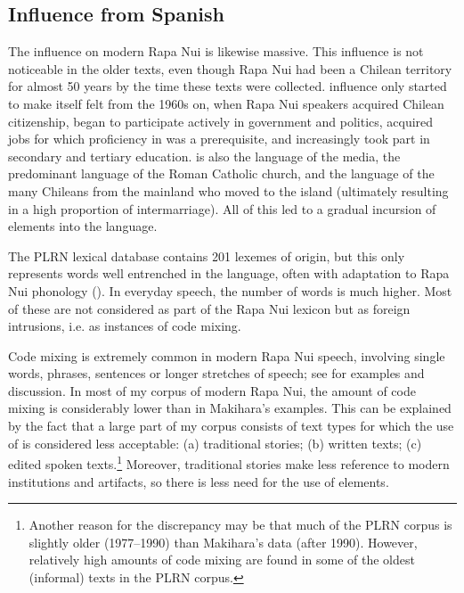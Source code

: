 \subsection{Influence from Spanish}\label{sec:1.4.2}

The  influence on modern Rapa Nui is likewise massive. This influence is not noticeable in the older texts, even though Rapa Nui had been a Chilean territory for almost 50 years by the time these texts were collected.  influence only started to make itself felt from the 1960s on, when Rapa Nui speakers acquired Chilean citizenship, began to participate actively in government and politics, acquired jobs for which proficiency in  was a prerequisite, and increasingly took part in secondary and tertiary education.  is also the language of the media, the predominant language of the Roman Catholic church, and the language of the many Chileans from the mainland who moved to the island (ultimately resulting in a high proportion of intermarriage). All of this led to a gradual incursion of  elements into the language. 

The PLRN lexical database contains 201 lexemes of  origin, but this only represents words well entrenched in the language, often with adaptation to Rapa Nui phonology (). In everyday speech, the number of  words is much higher. Most of these are not considered as part of the Rapa Nui lexicon but as foreign intrusions, i.e. as instances of code mixing. 

Code mixing is extremely common in modern Rapa Nui speech, involving single words, phrases, sentences or longer stretches of speech; see \citet{Makihara2001Changing,Makihara2001Adaptation,Makihara2004,Makihara2007,Makihara2009} for examples and discussion. In most of my corpus of modern Rapa Nui, the amount of code mixing is considerably lower than in Makihara’s examples. This can be explained by the fact that a large part of my corpus consists of text types for which the use of  is considered less acceptable: (a) traditional stories; (b) written texts; (c) edited spoken texts.\footnote{\label{fn:20}Another reason for the discrepancy may be that much of the PLRN corpus is slightly older (1977–1990) than Makihara’s data (after 1990). However, relatively high amounts of code mixing are found in some of the oldest (informal) texts in the PLRN corpus.} Moreover, traditional stories make less reference to modern institutions and artifacts, so there is less need for the use of  elements.

